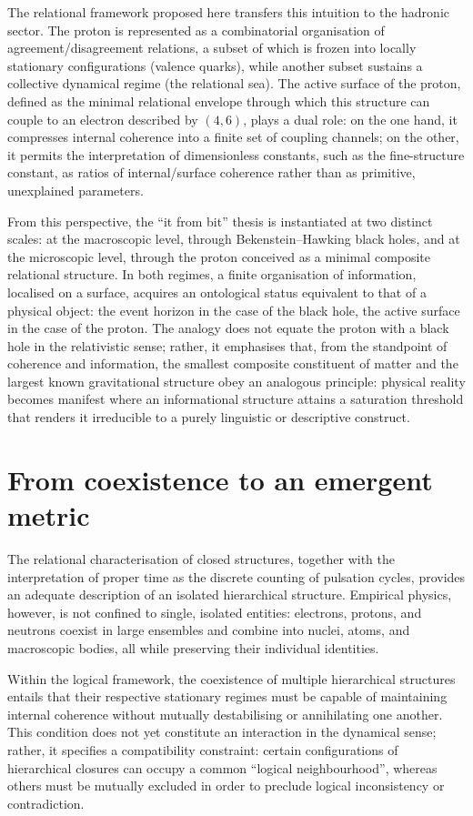 \documentclass[11pt,a4paper]{article}
\begin{document}
The relational framework proposed here transfers this intuition to the hadronic sector. The proton is represented as a combinatorial organisation of agreement/disagreement relations, a subset of which is frozen into locally stationary configurations (valence quarks), while another subset sustains a collective dynamical regime (the relational sea). The active surface of the proton, defined as the minimal relational envelope through which this structure can couple to an electron described by \((4,6)\), plays a dual role: on the one hand, it compresses internal coherence into a finite set of coupling channels; on the other, it permits the interpretation of dimensionless constants, such as the fine-structure constant, as ratios of internal/surface coherence rather than as primitive, unexplained parameters.

From this perspective, the “it from bit” thesis is instantiated at two distinct scales: at the macroscopic level, through Bekenstein–Hawking black holes, and at the microscopic level, through the proton conceived as a minimal composite relational structure. In both regimes, a finite organisation of information, localised on a surface, acquires an ontological status equivalent to that of a physical object: the event horizon in the case of the black hole, the active surface in the case of the proton. The analogy does not equate the proton with a black hole in the relativistic sense; rather, it emphasises that, from the standpoint of coherence and information, the smallest composite constituent of matter and the largest known gravitational structure obey an analogous principle: physical reality becomes manifest where an informational structure attains a saturation threshold that renders it irreducible to a purely linguistic or descriptive construct.

\section{From coexistence to an emergent metric}
The relational characterisation of closed structures, together with the interpretation of proper time as the discrete counting of pulsation cycles, provides an adequate description of an isolated hierarchical structure. Empirical physics, however, is not confined to single, isolated entities: electrons, protons, and neutrons coexist in large ensembles and combine into nuclei, atoms, and macroscopic bodies, all while preserving their individual identities.

Within the logical framework, the coexistence of multiple hierarchical structures entails that their respective stationary regimes must be capable of maintaining internal coherence without mutually destabilising or annihilating one another. This condition does not yet constitute an interaction in the dynamical sense; rather, it specifies a compatibility constraint: certain configurations of hierarchical closures can occupy a common “logical neighbourhood”, whereas others must be mutually excluded in order to preclude logical inconsistency or contradiction.
\end{document}
